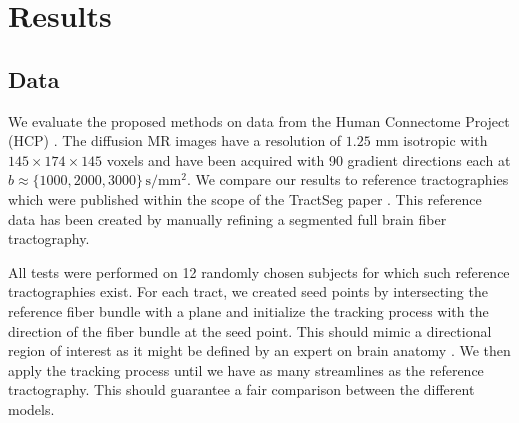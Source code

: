 \section{Results}
\label{sec:results}
\subsection{Data}
We evaluate the proposed methods on data from the Human
Connectome Project (HCP) \cite{HCP}. The diffusion MR images have a resolution of $1.25$ mm
isotropic with $145 \times 174 \times 145$ voxels and have been acquired with 90 gradient directions each at $b\approx\{1000,2000,3000\}\,\mathrm{s}/\mathrm{mm}^2$.
%
We compare our results to reference tractographies which were published within the
scope of the TractSeg paper \cite{WASSERTHAL2018239}. This reference data has been
created by manually refining a segmented full brain fiber tractography. %

All tests were performed on 12 randomly chosen subjects for which such reference tractographies
exist. For each tract, we created seed points by intersecting the reference
fiber bundle with a plane and initialize the tracking process with the direction
of the fiber bundle at the seed point. This should mimic a directional region of
interest as it might be defined by an expert on brain anatomy
\cite{Graumann2016}. We then apply the tracking process until we have as many
streamlines as the reference tractography. This should guarantee a fair comparison between the different models.

